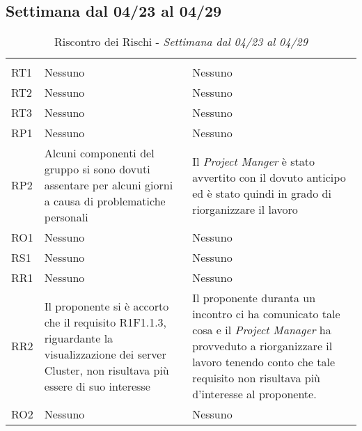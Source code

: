 \subsection{Settimana dal 04/23 al 04/29}
\label{sec:1SettRischi}
\begin{table}[H]
	\centering
	\begin{tabular}{|C{2.5cm}|C{5cm}|C{5cm}|}
		 & & \\
		RT1  & Nessuno & Nessuno \\
		\hline
		RT2  & Nessuno & Nessuno \\
		\hline
		RT3  & Nessuno & Nessuno \\
		\hline
		RP1  & Nessuno & Nessuno \\
		\hline
		RP2  & Alcuni componenti del gruppo si sono dovuti assentare per alcuni giorni a causa di problematiche personali & Il \textit{Project Manger} è stato avvertito con il dovuto anticipo ed è stato quindi in grado di riorganizzare il lavoro  \\
		\hline
		RO1  & Nessuno & Nessuno \\
		\hline
		RS1  & Nessuno & Nessuno \\
		\hline
		RR1  & Nessuno & Nessuno \\
		\hline
		RR2  & Il proponente si è accorto che il requisito R1F1.1.3, riguardante la visualizzazione dei server Cluster, non risultava più essere di suo interesse & Il proponente duranta un incontro ci ha comunicato tale cosa e il \textit{Project Manager } ha provveduto a riorganizzare il lavoro tenendo conto che tale requisito non risultava più d'interesse al proponente.  \\
		\hline
		RO2  & Nessuno & Nessuno \\
		\hline
	\end{tabular}
	\caption{Riscontro dei Rischi - \textit{Settimana dal 04/23 al 04/29}}
\end{table}





